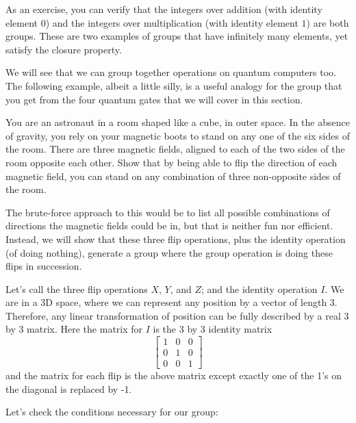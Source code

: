 \documentclass{article}
\theoremstyle{definition}
\begin{document}
As an exercise, you can verify that the integers over addition (with identity element $0$) and the integers over multiplication (with identity element $1$) are both groups.  These are two examples of groups that have infinitely many elements, yet satisfy the closure property.

We will see that we can group together operations on quantum computers too.  The following example, albeit a little silly, is a useful analogy for the group that you get from the four quantum gates that we will cover in this section.

\begin{example}
	\label{ex:groupfirstex}
	You are an astronaut in a room shaped like a cube, in outer space.  In the absence of gravity, you rely on your magnetic boots to stand on any one of the six sides of the room.  There are three magnetic fields, aligned to each of the two sides of the room opposite each other.  Show that by being able to flip the direction of each magnetic field, you can stand on any combination of three non-opposite sides of the room.
	
	\textnormal{The brute-force approach to this would be to list all possible combinations of directions the magnetic fields could be in, but that is neither fun nor efficient.  Instead, we will show that these three flip operations, plus the identity operation (of doing nothing), generate a group where the group operation is doing these flips in succession.}
	
	\textnormal{Let's call the three flip operations $X$, $Y$, and $Z$; and the identity operation $I$.  We are in a 3D space, where we can represent any position by a vector of length 3.  Therefore, any linear transformation of position can be fully described by a real 3 by 3 matrix.  Here the matrix for $I$ is the 3 by 3 identity matrix}
	\begin{equation*}
		\begin{bmatrix}
			1 & 0 & 0\\
			0 & 1 & 0\\
			0 & 0 & 1
		\end{bmatrix}
	\end{equation*}	
	\textnormal{and the matrix for each flip is the above matrix except exactly one of the 1's on the diagonal is replaced by -1.}
	
	\textnormal{Let's check the conditions necessary for our group:}


\end{example}
\end{document}
